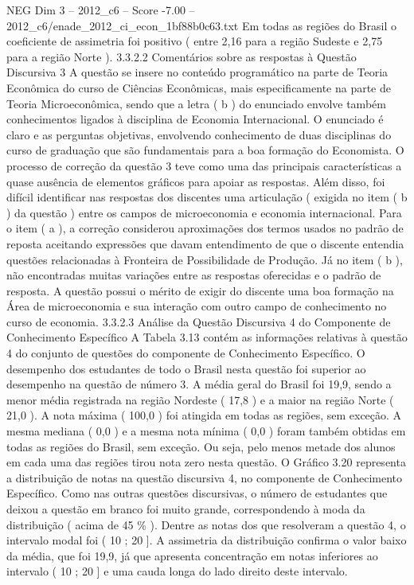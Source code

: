 \begin{textsample}{NEG Dim 3 – 2012\_c6 – Score -7.00 – 2012\_c6/enade\_2012\_ci\_econ\_1bf88b0c63.txt}
Em todas as regiões do Brasil o coeficiente de assimetria foi positivo ( entre 2,16 para a região Sudeste e 2,75 para a região Norte ). 3.3.2.2 Comentários sobre as respostas à Questão Discursiva 3 A questão se insere no conteúdo programático na parte de Teoria Econômica do curso de Ciências Econômicas, mais especificamente na parte de Teoria Microeconômica, sendo que a letra ( b ) do enunciado envolve também conhecimentos ligados à disciplina de Economia Internacional.
O enunciado é claro e as perguntas objetivas, envolvendo conhecimento de duas disciplinas do curso de graduação que são fundamentais para a boa formação do Economista.
O processo de correção da questão 3 teve como uma das principais características a quase ausência de elementos gráficos para apoiar as respostas.
Além disso, foi difícil identificar nas respostas dos discentes uma articulação ( exigida no item ( b ) da questão ) entre os campos de microeconomia e economia internacional.
Para o item ( a ), a correção considerou aproximações dos termos usados no padrão de reposta aceitando expressões que davam entendimento de que o discente entendia questões relacionadas à Fronteira de Possibilidade de Produção.
Já no item ( b ), não encontradas muitas variações entre as respostas oferecidas e o padrão de resposta.
A questão possui o mérito de exigir do discente uma boa formação na Área de microeconomia e sua interação com outro campo de conhecimento no curso de economia. 3.3.2.3 Análise da Questão Discursiva 4 do Componente de Conhecimento Específico A Tabela 3.13 contém as informações relativas à questão 4 do conjunto de questões do componente de Conhecimento Específico.
O desempenho dos estudantes de todo o Brasil nesta questão foi superior ao desempenho na questão de número 3.
A média geral do Brasil foi 19,9, sendo a menor média registrada na região Nordeste ( 17,8 ) e a maior na região Norte ( 21,0 ).
A nota máxima ( 100,0 ) foi atingida em todas as regiões, sem exceção.
A mesma mediana ( 0,0 ) e a mesma nota mínima ( 0,0 ) foram também obtidas em todas as regiões do Brasil, sem exceção.
Ou seja, pelo menos metade dos alunos em cada uma das regiões tirou nota zero nesta questão.
O Gráfico 3.20 representa a distribuição de notas na questão discursiva 4, no componente de Conhecimento Específico.
Como nas outras questões discursivas, o número de estudantes que deixou a questão em branco foi muito grande, correspondendo à moda da distribuição ( acima de 45 \% ).
Dentre as notas dos que resolveram a questão 4, o intervalo modal foi ( 10 ; 20 ].
A assimetria da distribuição confirma o valor baixo da média, que foi 19,9, já que apresenta concentração em notas inferiores ao intervalo ( 10 ; 20 ] e uma cauda longa do lado direito deste intervalo.

\end{textsample}
